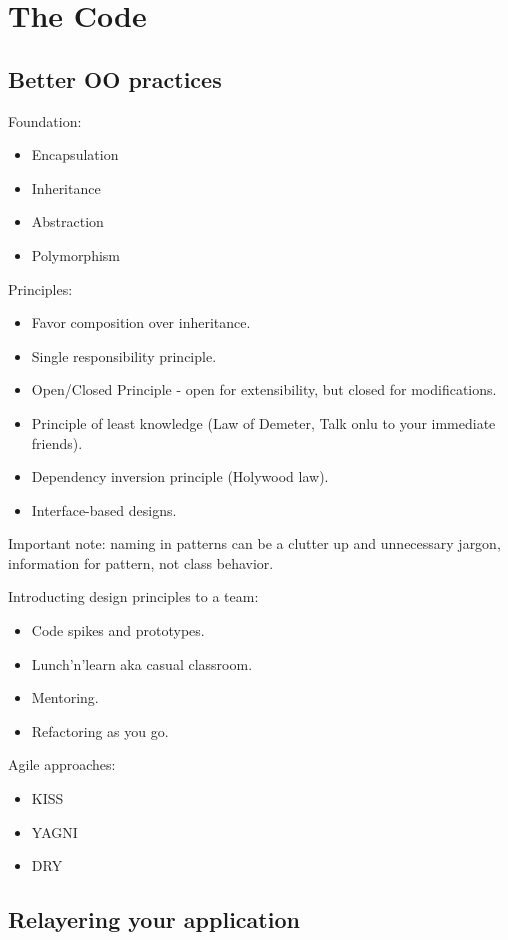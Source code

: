 \documentclass[11pt,a4paper]{article}
\begin{document}
\section{The Code}

\subsection{Better OO practices}
Foundation:
\begin{itemize}
	\item Encapsulation
	\item Inheritance
	\item Abstraction
	\item Polymorphism
\end{itemize}

Principles:
\begin{itemize}
	\item Favor composition over inheritance.
	\item Single responsibility principle.
	\item Open/Closed Principle - open for extensibility, but closed for modifications.
	\item Principle of least knowledge (Law of Demeter, Talk onlu to your immediate friends).
	\item Dependency inversion principle (Holywood law).
	\item Interface-based designs.
\end{itemize}

Important note: naming in patterns can be a clutter up and unnecessary jargon, information for pattern, not class behavior.

Introducting design principles to a team:
\begin{itemize}
	\item Code spikes and prototypes.
	\item Lunch'n'learn aka casual classroom.
	\item Mentoring.
	\item Refactoring as you go.
\end{itemize}

Agile approaches:
\begin{itemize}
	\item KISS
	\item YAGNI
	\item DRY
\end{itemize}

\subsection{Relayering your application}
\end{document}
